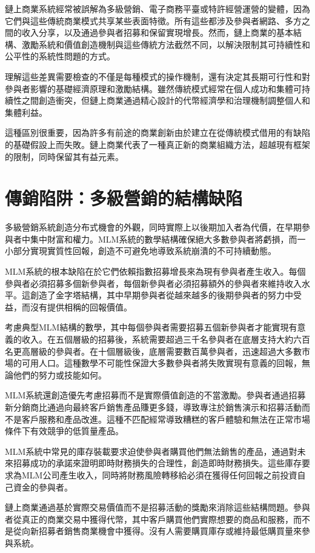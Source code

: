 \documentclass[
  Letterpaper,
]{scrbook}
\begin{document}
鏈上商業系統經常被誤解為多級營銷、電子商務平臺或特許經營運營的變體，因為它們與這些傳統商業模式共享某些表面特徵。所有這些都涉及參與者網路、多方之間的收入分享，以及通過參與者招募和保留實現增長。然而，鏈上商業的基本結構、激勵系統和價值創造機制與這些傳統方法截然不同，以解決限制其可持續性和公平性的系統性問題的方式。

理解這些差異需要檢查的不僅是每種模式的操作機制，還有決定其長期可行性和對參與者影響的基礎經濟原理和激勵結構。雖然傳統模式經常在個人成功和集體可持續性之間創造衝突，但鏈上商業通過精心設計的代幣經濟學和治理機制調整個人和集體利益。

這種區別很重要，因為許多有前途的商業創新由於建立在從傳統模式借用的有缺陷的基礎假設上而失敗。鏈上商業代表了一種真正新的商業組織方法，超越現有框架的限制，同時保留其有益元素。

\section{傳銷陷阱：多級營銷的結構缺陷}\label{ux50b3ux92b7ux9677ux9631ux591aux7d1aux71dfux92b7ux7684ux7d50ux69cbux7f3aux9677}

多級營銷系統創造分布式機會的外觀，同時實際上以後期加入者為代價，在早期參與者中集中財富和權力。MLM系統的數學結構確保絕大多數參與者將虧損，而一小部分實現實質性回報，創造不可避免地導致系統崩潰的不可持續動態。

MLM系統的根本缺陷在於它們依賴指數招募增長來為現有參與者產生收入。每個參與者必須招募多個新參與者，每個新參與者必須招募額外的參與者來維持收入水平。這創造了金字塔結構，其中早期參與者從越來越多的後期參與者的努力中受益，而沒有提供相稱的回報價值。

考慮典型MLM結構的數學，其中每個參與者需要招募五個新參與者才能實現有意義的收入。在五個層級的招募後，系統需要超過三千名參與者在底層支持大約六百名更高層級的參與者。在十個層級後，底層需要數百萬參與者，迅速超過大多數市場的可用人口。這種數學不可能性保證大多數參與者將失敗實現有意義的回報，無論他們的努力或技能如何。

MLM系統還創造優先考慮招募而不是實際價值創造的不當激勵。參與者通過招募新分銷商比通過向最終客戶銷售產品賺更多錢，導致專注於銷售演示和招募活動而不是客戶服務和產品改進。這種不匹配經常導致糟糕的客戶體驗和無法在正常市場條件下有效競爭的低質量產品。

MLM系統中常見的庫存裝載要求迫使參與者購買他們無法銷售的產品，通過對未來招募成功的承諾來證明即時財務損失的合理性，創造即時財務損失。這些庫存要求為MLM公司產生收入，同時將財務風險轉移給必須在獲得任何回報之前投資自己資金的參與者。

鏈上商業通過基於實際交易價值而不是招募活動的獎勵來消除這些結構問題。參與者從真正的商業交易中獲得代幣，其中客戶購買他們實際想要的商品和服務，而不是從向新招募者銷售商業機會中獲得。沒有人需要購買庫存或維持最低購買量來參與系統。
\end{document}
